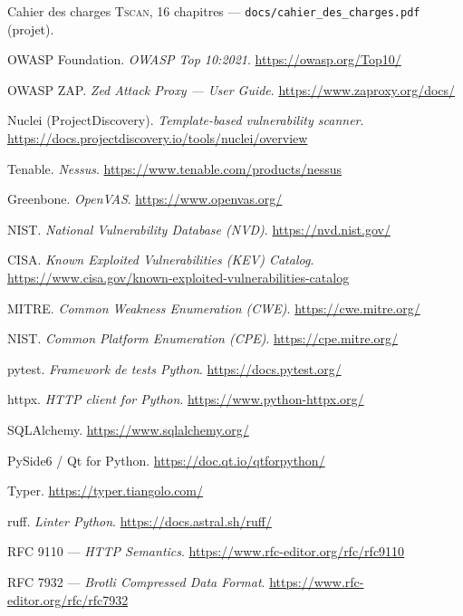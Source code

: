 \documentclass[11pt,a4paper]{report}
\newcommand{\tscan}{\textsc{Tscan}}
\newcommand{\code}[1]{\texttt{#1}}
\begin{document}
\begin{enumerate}[leftmargin=2em, label={[\arabic*]}]
  \item Cahier des charges \tscan{}, 16 chapitres --- \code{docs/cahier\_des\_charges.pdf} (projet).
  \item OWASP Foundation. \textit{OWASP Top 10:2021}. \url{https://owasp.org/Top10/}
  \item OWASP ZAP. \textit{Zed Attack Proxy --- User Guide}. \url{https://www.zaproxy.org/docs/}
  \item Nuclei (ProjectDiscovery). \textit{Template-based vulnerability scanner}.
        \url{https://docs.projectdiscovery.io/tools/nuclei/overview}
  \item Tenable. \textit{Nessus}. \url{https://www.tenable.com/products/nessus}
  \item Greenbone. \textit{OpenVAS}. \url{https://www.openvas.org/}
  \item NIST. \textit{National Vulnerability Database (NVD)}. \url{https://nvd.nist.gov/}
  \item CISA. \textit{Known Exploited Vulnerabilities (KEV) Catalog}.
        \url{https://www.cisa.gov/known-exploited-vulnerabilities-catalog}
  \item MITRE. \textit{Common Weakness Enumeration (CWE)}. \url{https://cwe.mitre.org/}
  \item NIST. \textit{Common Platform Enumeration (CPE)}. \url{https://cpe.mitre.org/}
  \item pytest. \textit{Framework de tests Python}. \url{https://docs.pytest.org/}
  \item httpx. \textit{HTTP client for Python}. \url{https://www.python-httpx.org/}
  \item SQLAlchemy. \url{https://www.sqlalchemy.org/}
  \item PySide6 / Qt for Python. \url{https://doc.qt.io/qtforpython/}
  \item Typer. \url{https://typer.tiangolo.com/}
  \item ruff. \textit{Linter Python}. \url{https://docs.astral.sh/ruff/}
  \item RFC 9110 --- \textit{HTTP Semantics}. \url{https://www.rfc-editor.org/rfc/rfc9110}
  \item RFC 7932 --- \textit{Brotli Compressed Data Format}. \url{https://www.rfc-editor.org/rfc/rfc7932}
\end{enumerate}

\appendix
\end{document}

